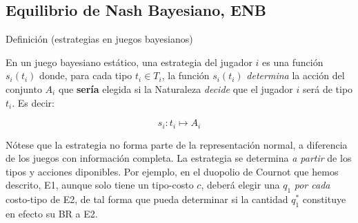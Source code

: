 \documentclass[12pt]{article}
\begin{document}






\subsection{Equilibrio de Nash Bayesiano, ENB}

\begin{mybox}{Definición (estrategias en juegos bayesianos)}
	\begin{defi}
		En un juego bayesiano estático, una estrategia del jugador $i$ es una función $s_i(t_i)$ donde, para cada tipo $t_i \in T_i$, la función $s_i(t_i)$ \textit{determina} la acción del conjunto $A_i$ que \textbf{sería} elegida si la Naturaleza \textit{decide} que el jugador $i$ será de tipo $t_i$.
		Es decir:

		\[s_i\colon t_i \mapsto A_i \]

	\end{defi}
\end{mybox}

Nótese que la estrategia no forma parte de la representación normal, a diferencia de los juegos con información completa. La estrategia se determina \textit{a partir} de los tipos y acciones diponibles. Por ejemplo, en el duopolio de Cournot que hemos descrito, E1, aunque solo tiene un tipo-costo $c$, deberá elegir una $q_1$ \textit{por cada} costo-tipo de E2, de tal forma que pueda determinar si la cantidad $q_1^*$ constituye en efecto su BR a E2.
\end{document}
